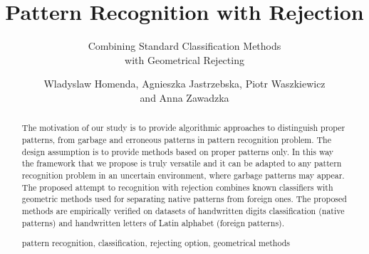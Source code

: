 \documentclass{llncs}
\newcommand{\keywords}[1]{\par\addvspace\baselineskip
\noindent\keywordname\enspace\ignorespaces#1}
\begin{document}
\title{Pattern Recognition with Rejection}
\subtitle{Combining Standard Classification Methods\\with Geometrical Rejecting}

%

\author{Wladyslaw Homenda, Agnieszka Jastrzebska, Piotr Waszkiewicz\\ and Anna Zawadzka}
%

\vspace{-6pt}
\vspace{-6pt}
\maketitle
\vspace{-6pt}

\pagestyle{empty}  %

\begin{abstract}
\vspace{-12pt}
The motivation of our study is to provide algorithmic approaches to distinguish proper patterns, from garbage and erroneous patterns in pattern recognition problem. The design assumption is to provide methods based on proper patterns only. In this way the framework that we propose is truly versatile and it can be adapted to any pattern recognition problem in an uncertain environment, where garbage patterns may appear. The proposed attempt to recognition with rejection combines known classifiers with geometric methods used for separating native patterns from foreign ones. The proposed methods are empirically verified on datasets of handwritten digits classification (native patterns) and handwritten letters of Latin alphabet (foreign patterns).
\vspace{-6pt}
\keywords pattern recognition, classification, rejecting option, geometrical methods
\vspace{-6pt}
\end{abstract}
\end{document}
